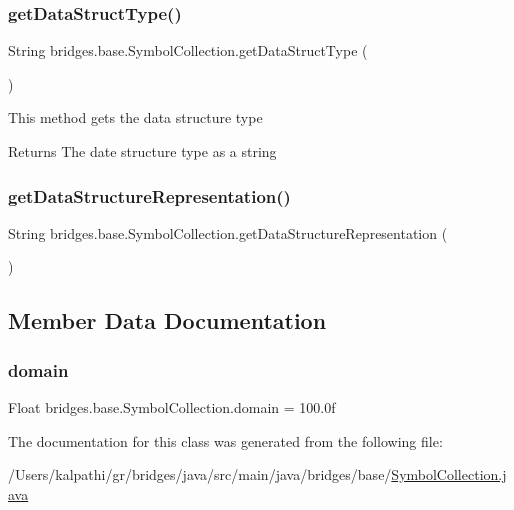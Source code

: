 \subsubsection{\texorpdfstring{getDataStructType()}{getDataStructType()}}
{\footnotesize\ttfamily String bridges.\+base.\+Symbol\+Collection.\+get\+Data\+Struct\+Type (\begin{DoxyParamCaption}{ }\end{DoxyParamCaption})}

This method gets the data structure type

\begin{DoxyReturn}{Returns}
The date structure type as a string 
\end{DoxyReturn}
\mbox{\label{classbridges_1_1base_1_1_symbol_collection_a706ad8a7bcf12c194403ac3281c73674}} 
\subsubsection{\texorpdfstring{getDataStructureRepresentation()}{getDataStructureRepresentation()}}
{\footnotesize\ttfamily String bridges.\+base.\+Symbol\+Collection.\+get\+Data\+Structure\+Representation (\begin{DoxyParamCaption}{ }\end{DoxyParamCaption})}



\subsection{Member Data Documentation}
\mbox{\label{classbridges_1_1base_1_1_symbol_collection_a7624e96d2a4b5b6264791eb8dacbd350}} 
\subsubsection{\texorpdfstring{domain}{domain}}
{\footnotesize\ttfamily Float bridges.\+base.\+Symbol\+Collection.\+domain = 100.\+0f\hspace{0.3cm}{\ttfamily [protected]}}



The documentation for this class was generated from the following file\+:\begin{DoxyCompactItemize}
\item 
/\+Users/kalpathi/gr/bridges/java/src/main/java/bridges/base/\mbox{\hyperlink{_symbol_collection_8java}{Symbol\+Collection.\+java}}\end{DoxyCompactItemize}
